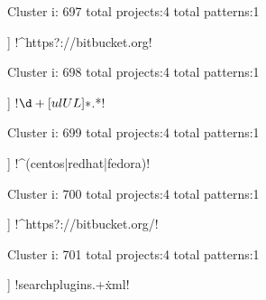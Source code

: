 Cluster i: 697
total projects:4
total patterns:1
\begin{multicols}{1}
\begin{description}[noitemsep,topsep=0pt]
\item [[4] ] \cverb!^https?://bitbucket.org!
\end{description}
\end{multicols}







Cluster i: 698
total projects:4
total patterns:1
\begin{multicols}{1}
\begin{description}[noitemsep,topsep=0pt]
\item [[4] ] \cverb!\s*\(\d+[ulUL]*\).*!
\end{description}
\end{multicols}







Cluster i: 699
total projects:4
total patterns:1
\begin{multicols}{1}
\begin{description}[noitemsep,topsep=0pt]
\item [[4] ] \cverb!^(centos|redhat|fedora)!
\end{description}
\end{multicols}







Cluster i: 700
total projects:4
total patterns:1
\begin{multicols}{1}
\begin{description}[noitemsep,topsep=0pt]
\item [[4] ] \cverb!^https?://bitbucket.org/!
\end{description}
\end{multicols}







Cluster i: 701
total projects:4
total patterns:1
\begin{multicols}{1}
\begin{description}[noitemsep,topsep=0pt]
\item [[4] ] \cverb!searchplugins\/.+\.xml!
\end{description}
\end{multicols}







